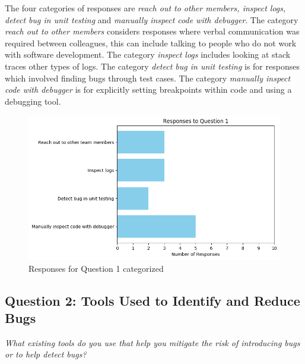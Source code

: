 \documentclass[../main.tex]{subfiles}
\begin{document}
The four categories of responses are \textit{reach out to other  members, inspect logs, detect bug in unit testing} and \textit{manually inspect code with debugger}. The category \textit{reach out to other members} considers responses where verbal communication was required between colleagues, this can include talking to people who do not work with software development. The category \textit{inspect logs} includes looking at stack traces other types of logs. The category \textit{detect bug in unit testing} is for responses which involved finding bugs through test cases. The category \textit{manually inspect code with debugger} is for explicitly setting breakpoints within code and using a debugging tool. 

\begin{figure}[H]
    \centering
    \includegraphics[scale=0.7]{images/Results/RQ2/RQ2_question_1.png}
    \caption{Responses for Question 1 categorized}
    \label{fig:rq2Image1}
\end{figure}

\subsection{Question 2: Tools Used to Identify and Reduce Bugs}

\textit{What existing tools do you use that help you mitigate the risk of introducing bugs or to help detect bugs?}
\end{document}
